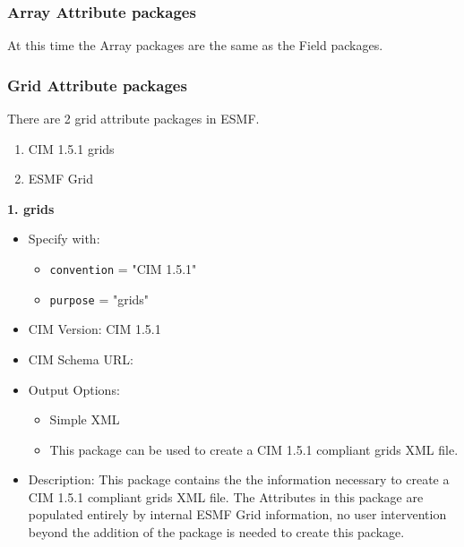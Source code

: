 \vspace{.20in}

\subsubsection{Array Attribute packages}
\label{ArrayAttributePackages}

At this time the Array packages are the same as the Field packages.

\vspace{.20in}

\subsubsection{Grid Attribute packages}
\label{GridAttributePackages}

There are 2 grid attribute packages in ESMF. 

\begin{enumerate}
    \item CIM 1.5.1 grids
    \item ESMF Grid
\end{enumerate}

\vspace{.20in}

{\bf 1. grids}

\label{CIMGridAttributePackage}

\begin{itemize}
    \item Specify with:
    \begin{itemize}
        \item {\tt convention} = "CIM 1.5.1"
        \item {\tt purpose} = "grids"
    \end{itemize}
    \item CIM Version: CIM 1.5.1
    \item CIM Schema URL: 
    \item Output Options:
    \begin{itemize}
        \item Simple XML
        \item This package can be used to create a CIM 1.5.1 compliant grids XML file.
    \end{itemize}
    \item Description: This package contains the the information necessary to create a CIM 1.5.1 compliant grids XML file.  The Attributes in this package are populated entirely by internal ESMF Grid information, no user intervention beyond the addition of the package is needed to create this package.
\end{itemize}


